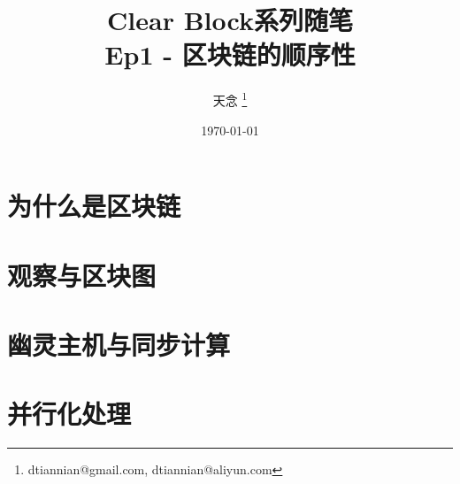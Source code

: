 \documentclass{beamer}
\title{Clear Block系列随笔 \\ Ep1 - 区块链的顺序性}
\author{天念 \thanks{dtiannian@gmail.com, dtiannian@aliyun.com}}
\date{\today}
\begin{document}
\begin{frame}
    \titlepage
\end{frame}

\section{为什么是区块链}
\section{观察与区块图}
\section{幽灵主机与同步计算}
\section{并行化处理}


\end{document}
